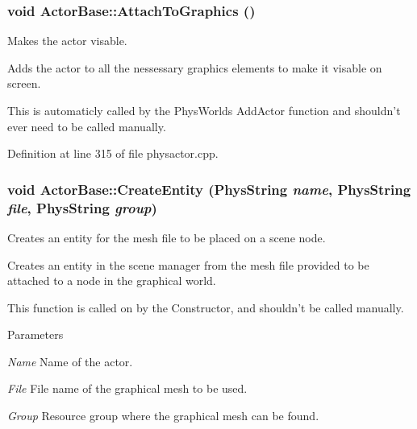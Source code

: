 \hypertarget{classActorBase_afab604970fede16ccde0c6b8e72d9ee0}{
\subsubsection[{AttachToGraphics}]{\setlength{\rightskip}{0pt plus 5cm}void ActorBase::AttachToGraphics ()}}
\label{dd/d7b/classActorBase_afab604970fede16ccde0c6b8e72d9ee0}


Makes the actor visable. 

Adds the actor to all the nessessary graphics elements to make it visable on screen. \par
 This is automaticly called by the PhysWorlds AddActor function and shouldn't ever need to be called manually. 

Definition at line 315 of file physactor.cpp.

\hypertarget{classActorBase_aa87583c47b8653e8ac7d96f1481b57fd}{
\subsubsection[{CreateEntity}]{\setlength{\rightskip}{0pt plus 5cm}void ActorBase::CreateEntity (PhysString {\em name}, \/  PhysString {\em file}, \/  PhysString {\em group})}}
\label{dd/d7b/classActorBase_aa87583c47b8653e8ac7d96f1481b57fd}


Creates an entity for the mesh file to be placed on a scene node. 

Creates an entity in the scene manager from the mesh file provided to be attached to a node in the graphical world. \par
 This function is called on by the Constructor, and shouldn't be called manually. 
\begin{DoxyParams}{Parameters}
\item[{\em Name}]Name of the actor. \item[{\em File}]File name of the graphical mesh to be used. \item[{\em Group}]Resource group where the graphical mesh can be found. \end{DoxyParams}


